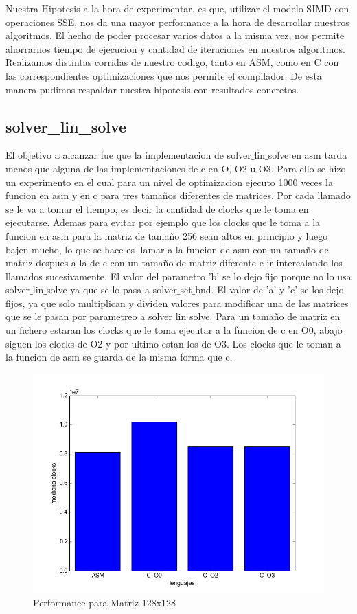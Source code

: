 \graphicspath{{./img/}}

Nuestra Hipotesis a la hora de experimentar, es que, utilizar el modelo SIMD con operaciones SSE, nos da una mayor performance a la hora de desarrollar nuestros algoritmos. El hecho de poder procesar varios datos a la misma vez, nos permite ahorrarnos tiempo de ejecucion y cantidad de iteraciones en nuestros algoritmos.
Realizamos distintas corridas de nuestro codigo, tanto en ASM, como en C con las correspondientes optimizaciones que nos permite el compilador. De esta manera pudimos respaldar nuestra hipotesis con resultados concretos.

\subsection{solver\_lin\_solve}

El objetivo a alcanzar fue que la implementacion de solver$\_$lin$\_$solve en asm tarda menos que alguna de las implementaciones de c en O, O2 u O3. Para ello se hizo un experimento en el cual para un nivel de optimizacion ejecuto 1000 veces la funcion en asm y en c para tres tamaños diferentes de matrices. Por cada llamado se le va a tomar el tiempo, es decir la cantidad de clocks que le toma en ejecutarse. Ademas para evitar por ejemplo que los clocks que le toma a la funcion en asm para la matriz de tamaño 256 sean altos en principio y luego bajen mucho, lo que se hace es llamar a la funcion de asm con un tamaño de matriz despues a la de c con un tamaño de matriz diferente e ir intercalando los llamados sucesivamente. 
El valor del parametro 'b' se lo dejo fijo porque no lo usa solver$\_$lin$\_$solve ya que se lo pasa a solver$\_$set$\_$bnd. El valor de 'a' y 'c' se los dejo fijos, ya que solo multiplican y dividen valores para modificar una de las matrices que se le pasan por parametreo a solver$\_$lin$\_$solve.
Para un tamaño de matriz en un fichero estaran los clocks que le toma ejecutar a la funcion de c en O0, abajo siguen los clocks de O2 y por ultimo estan los de O3. Los clocks que le toman a la funcion de asm se guarda de la misma forma que c.
  

\begin{figure}[h]
  \centering
    \includegraphics[width=.6\linewidth]{Matriz_128.png}
    \caption{Performance para Matriz 128x128}
    \label{fig:M128}
\end{figure}

